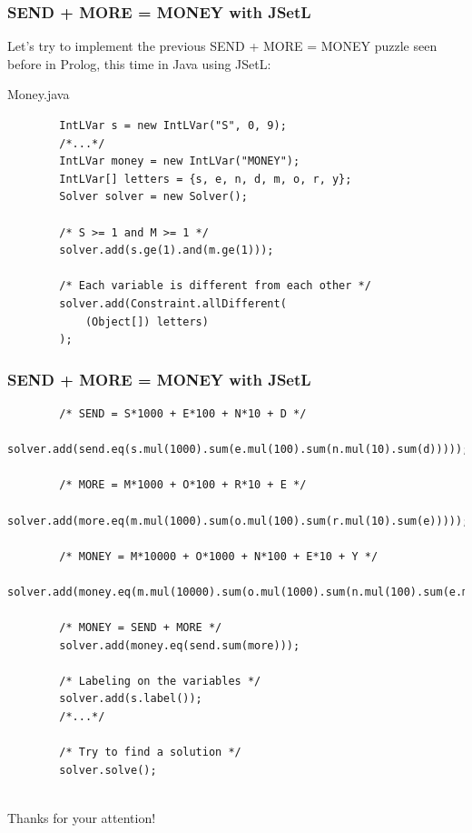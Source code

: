 \begin{frame}[fragile]
\frametitle{SEND + MORE = MONEY with JSetL}
Let's try to implement the previous SEND + MORE = MONEY puzzle seen before in Prolog, this time in Java using JSetL:\\
\begin{exampleblock}{Money.java}
\begin{lstlisting}
		IntLVar s = new IntLVar("S", 0, 9);
		/*...*/
		IntLVar money = new IntLVar("MONEY");
		IntLVar[] letters = {s, e, n, d, m, o, r, y};
		Solver solver = new Solver();
		
		/* S >= 1 and M >= 1 */
		solver.add(s.ge(1).and(m.ge(1)));

		/* Each variable is different from each other */
		solver.add(Constraint.allDifferent(
			(Object[]) letters)
		);
\end{lstlisting}
\end{exampleblock}
\end{frame}

\begin{frame}[fragile]
\frametitle{SEND + MORE = MONEY with JSetL}
\begin{lstlisting}
		/* SEND = S*1000 + E*100 + N*10 + D */
		solver.add(send.eq(s.mul(1000).sum(e.mul(100).sum(n.mul(10).sum(d)))));
		
		/* MORE = M*1000 + O*100 + R*10 + E */
		solver.add(more.eq(m.mul(1000).sum(o.mul(100).sum(r.mul(10).sum(e)))));
		
		/* MONEY = M*10000 + O*1000 + N*100 + E*10 + Y */
		solver.add(money.eq(m.mul(10000).sum(o.mul(1000).sum(n.mul(100).sum(e.mul(10).sum(y))))));
		
		/* MONEY = SEND + MORE */
		solver.add(money.eq(send.sum(more)));
		
		/* Labeling on the variables */
		solver.add(s.label());
		/*...*/
		
		/* Try to find a solution */
		solver.solve();
	
\end{lstlisting}
\end{frame}

\begin{frame}{  }
\centering \huge Thanks for your attention!
\end{frame}


